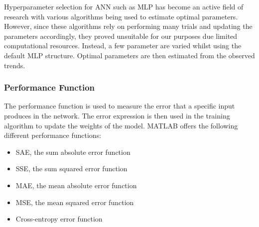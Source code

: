 Hyperparameter selection for ANN such as MLP has become an active field of research with various algorithms being used to estimate optimal parameters\cite{bergstra2011algorithms}. However, since these algorithms rely on performing many trials and updating the parameters accordingly, they proved unsuitable for our purposes due limited computational resources. Instead, a few parameter are varied whilst using the default MLP structure. Optimal parameters are then estimated from the observed trends.
%
%
%

 \subsubsection{Performance Function}

 The performance function is used to measure the error that a specific input produces in the network. The error expression is then used in the training algorithm to update the weights of the model\cite{hecht1988theory}. MATLAB offers the following different performance functions:

 \begin{itemize}
 	\item SAE, the sum absolute error function
 	\item SSE, the sum squared error function
 	\item MAE, the mean absolute error function
 	\item MSE, the mean squared error function
 	\item Cross-entropy error function
 \end{itemize}

